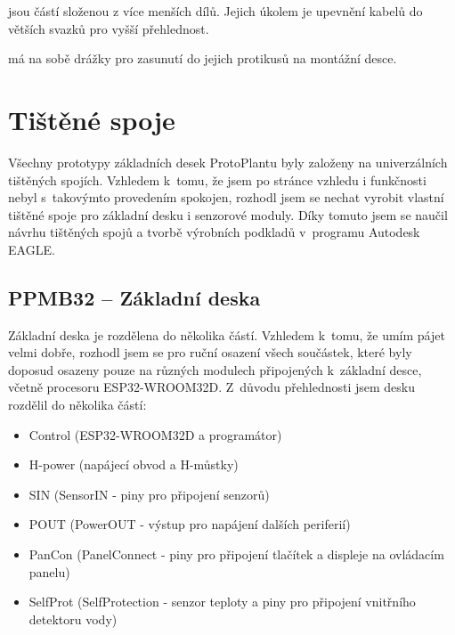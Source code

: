 \noindent{} jsou částí složenou z více menších dílů.
Jejich úkolem je upevnění kabelů do větších svazků pro vyšší přehlednost.

\noindent{} má na sobě drážky pro zasunutí do jejich protikusů na montážní desce.


\chapter{Tištěné spoje}
Všechny prototypy základních desek ProtoPlantu byly založeny na univerzálních tištěných spojích. Vzhledem k~tomu, že jsem po stránce vzhledu i funkčnosti nebyl s~takovýmto provedením spokojen, rozhodl jsem se nechat vyrobit vlastní tištěné spoje pro základní desku i senzorové moduly.
Díky tomuto jsem se naučil návrhu tištěných spojů a tvorbě výrobních podkladů v~programu Autodesk EAGLE.

\section{PPMB32 -- Základní deska}
\label{subsec:motherBoard}
Základní deska je rozdělena do několika částí. 
Vzhledem k~tomu, že umím pájet velmi dobře, rozhodl jsem se pro ruční osazení všech součástek, které byly doposud osazeny pouze na různých modulech připojených k~základní desce, včetně procesoru ESP32-WROOM32D.
Z~důvodu přehlednosti jsem desku rozdělil do několika částí:

\begin{itemize}
    \item Control (ESP32-WROOM32D a programátor)
    \item H-power (napájecí obvod a H-můstky)
    \item SIN (SensorIN - piny pro připojení senzorů)
    \item POUT (PowerOUT - výstup pro napájení dalších periferií)
    \item PanCon (PanelConnect - piny pro připojení tlačítek a displeje na ovládacím panelu)
    \item SelfProt (SelfProtection - senzor teploty a piny pro připojení vnitřního detektoru vody)
\end{itemize} 


